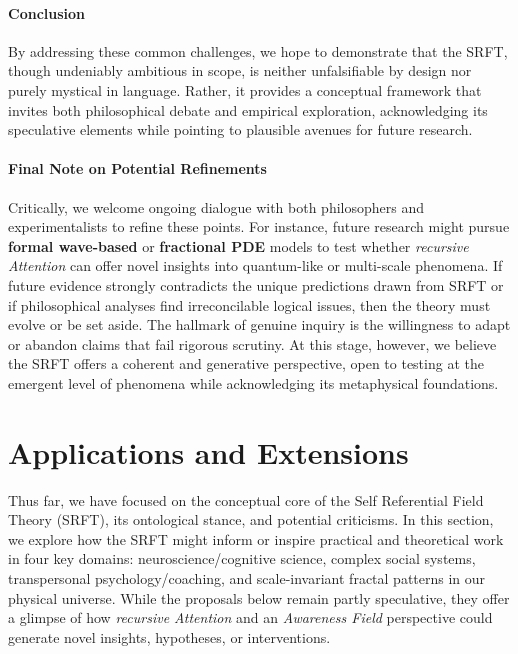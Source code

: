 \documentclass[12pt,a4paper]{article}
\begin{document}
\medskip
\paragraph{Conclusion}
By addressing these common challenges, we hope to demonstrate that the SRFT, though undeniably ambitious in scope, is neither unfalsifiable by design nor purely mystical in language. Rather, it provides a conceptual framework that invites both philosophical debate and empirical exploration, acknowledging its speculative elements while pointing to plausible avenues for future research.


\paragraph{Final Note on Potential Refinements}
Critically, we welcome ongoing dialogue with both philosophers and experimentalists to refine these points. For instance, future research might pursue \textbf{formal wave-based} or \textbf{fractional PDE} models to test whether \emph{recursive Attention} can offer novel insights into quantum-like or multi-scale phenomena. If future evidence strongly contradicts the unique predictions drawn from SRFT or if philosophical analyses find irreconcilable logical issues, then the theory must evolve or be set aside. The hallmark of genuine inquiry is the willingness to adapt or abandon claims that fail rigorous scrutiny. At this stage, however, we believe the SRFT offers a coherent and generative perspective, open to testing at the emergent level of phenomena while acknowledging its metaphysical foundations.

\section{Applications and Extensions}
\label{sec:applications-extensions}

Thus far, we have focused on the conceptual core of the Self Referential Field Theory (SRFT), its ontological stance, and potential criticisms. In this section, we explore how the SRFT might inform or inspire practical and theoretical work in four key domains: neuroscience/cognitive science, complex social systems, transpersonal psychology/coaching, and scale-invariant fractal patterns in our physical universe. While the proposals below remain partly speculative, they offer a glimpse of how \emph{recursive Attention} and an \emph{Awareness Field} perspective could generate novel insights, hypotheses, or interventions.
\end{document}
